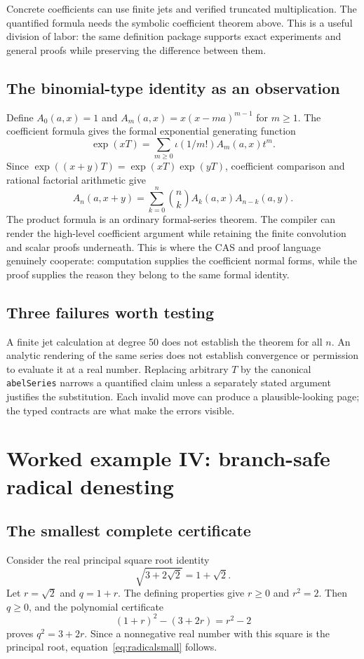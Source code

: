 \documentclass[11pt,a4paper]{article}
\newcommand{\code}[1]{\nolinkurl{#1}}
\theoremstyle{definition}
\begin{document}
Concrete coefficients can use finite jets and verified truncated multiplication.
The quantified formula needs the symbolic coefficient theorem above. This is a
useful division of labor: the same definition package supports exact experiments
and general proofs while preserving the difference between them.

\subsection{The binomial-type identity as an observation}
Define $A_0(a,x)=1$ and
$A_m(a,x)=x(x-ma)^{m-1}$ for $m\ge1$. The coefficient formula gives the formal
exponential generating function
\[
 \exp(xT)=\sum_{m\ge0}\iota(1/m!)A_m(a,x)t^m.
\]
Since $\exp((x+y)T)=\exp(xT)\exp(yT)$, coefficient comparison and rational
factorial arithmetic give
\[
 A_n(a,x+y)=\sum_{k=0}^{n}\binom nk
                     A_k(a,x)A_{n-k}(a,y).
\]
The product formula is an ordinary formal-series theorem. The compiler can
render the high-level coefficient argument while retaining the finite convolution
and scalar proofs underneath. This is where the CAS and proof language genuinely
cooperate: computation supplies the coefficient normal forms, while the proof
supplies the reason they belong to the same formal identity.

\subsection{Three failures worth testing}
A finite jet calculation at degree 50 does not establish the theorem for all
$n$. An analytic rendering of the same series does not establish convergence
or permission to evaluate it at a real number. Replacing arbitrary $T$ by the
canonical \code{abelSeries} narrows a quantified claim unless a separately
stated argument justifies the substitution. Each invalid move can produce a
plausible-looking page; the typed contracts are what make the errors visible.

\section{Worked example IV: branch-safe radical denesting}
\label{sec:radicals}
\subsection{The smallest complete certificate}
Consider the real principal square root identity
\begin{equation}
 \sqrt{3+2\sqrt2}=1+\sqrt2.
 \label{eq:radicalsmall}
\end{equation}
Let $r=\sqrt2$ and $q=1+r$. The defining properties give $r\ge0$ and $r^2=2$.
Then $q\ge0$, and the polynomial certificate
\[
 (1+r)^2-(3+2r)=r^2-2
\]
proves $q^2=3+2r$. Since a nonnegative real number with this square is the
principal root, equation~\eqref{eq:radicalsmall} follows.
\end{document}
